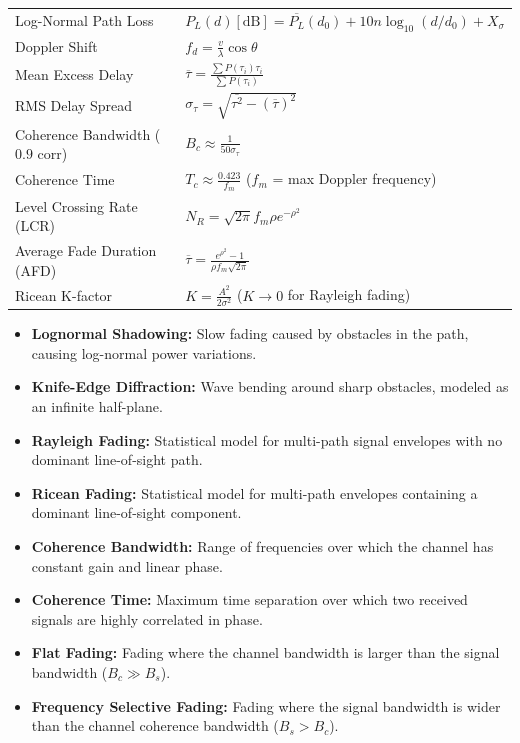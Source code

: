 \documentclass[12pt,a4paper]{article}
\renewcommand{\arraystretch}{1.45}
\begin{document}
\begin{tcolorbox}[formulabox, title={\textbf{Key Formulas at a Glance}}]
\renewcommand{\arraystretch}{1.3}
\begin{tabularx}{\linewidth}{B{5.5cm} X}Log-Normal Path Loss & $P_L(d)[\text{dB}] = \overline{P_L}(d_0) + 10 n \log_{10}(d/d_0) + X_\sigma$ \\
Doppler Shift & $f_d = \frac{v}{\lambda} \cos \theta$ \\
Mean Excess Delay & $\overline{\tau} = \frac{\sum P(\tau_i) \tau_i}{\sum P(\tau_i)}$ \\
RMS Delay Spread & $\sigma_\tau = \sqrt{\overline{\tau^2} - (\overline{\tau})^2}$ \\
Coherence Bandwidth ($0.9$ corr) & $B_c \approx \frac{1}{50\sigma_\tau}$ \\
Coherence Time & $T_c \approx \frac{0.423}{f_m}$ \quad ($f_m$ = max Doppler frequency) \\
Level Crossing Rate (LCR) & $N_R = \sqrt{2\pi} f_m \rho e^{-\rho^2}$ \\
Average Fade Duration (AFD) & $\overline{\tau} = \frac{e^{\rho^2} - 1}{\rho f_m \sqrt{2\pi}}$ \\
Ricean K-factor & $K = \frac{A^2}{2\sigma^2}$ \quad ($K \to 0$ for Rayleigh fading)
\end{tabularx}
\end{tcolorbox}

\begin{tcolorbox}[defbox, title={\textbf{One-Line Definitions}}]
\begin{itemize}[leftmargin=*, itemsep=2.5pt, topsep=0pt]
  \item \textbf{Lognormal Shadowing:} Slow fading caused by obstacles in the path, causing log-normal power variations.
  \item \textbf{Knife-Edge Diffraction:} Wave bending around sharp obstacles, modeled as an infinite half-plane.
  \item \textbf{Rayleigh Fading:} Statistical model for multi-path signal envelopes with no dominant line-of-sight path.
  \item \textbf{Ricean Fading:} Statistical model for multi-path envelopes containing a dominant line-of-sight component.
  \item \textbf{Coherence Bandwidth:} Range of frequencies over which the channel has constant gain and linear phase.
  \item \textbf{Coherence Time:} Maximum time separation over which two received signals are highly correlated in phase.
  \item \textbf{Flat Fading:} Fading where the channel bandwidth is larger than the signal bandwidth ($B_c \gg B_s$).
  \item \textbf{Frequency Selective Fading:} Fading where the signal bandwidth is wider than the channel coherence bandwidth ($B_s > B_c$).
\end{itemize}
\end{tcolorbox}
\end{document}
